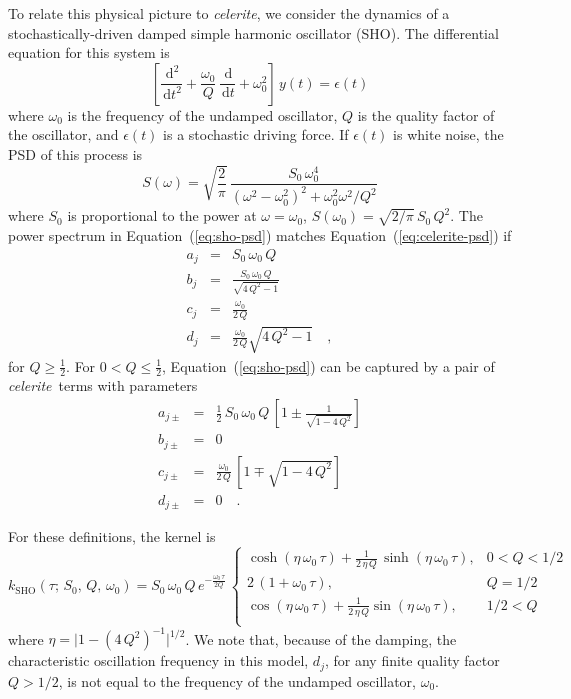 \documentclass[manuscript, letterpaper]{aastex6}
\newcommand{\celeriteterm}{\emph{celerite}}
\renewcommand{\eqref}[1]{\ref{eq:#1}}
\newcommand{\Eq}[1]{Equation~(\eqref{#1})}
\newcommand{\eq}[1]{\Eq{#1}}
\newcommand{\eqlabel}[1]{\label{eq:#1}}
\newcommand{\dd}{\ensuremath{\,\mathrm{d}}}
\begin{document}
To relate this physical picture to \celeriteterm, we consider the dynamics of a
stochastically-driven damped simple harmonic oscillator (SHO).
The differential equation for this system is
\begin{equation}
    \left[\frac{\dd^2}{\dd t^2} + \frac{\omega_0}{Q}\,\frac{\dd}{\dd t}
    + \omega_0^2\right]\, y(t) = \epsilon(t)
\end{equation}
where $\omega_0$ is the frequency of the undamped oscillator, $Q$ is the
quality factor of the oscillator, and $\epsilon(t)$ is a stochastic driving
force.
If $\epsilon(t)$ is white noise, the PSD of this process is
\citep{Anderson:1990}
\begin{equation}\eqlabel{sho-psd}
S(\omega) = \sqrt{\frac{2}{\pi}}\,\frac{S_0\,\omega_0^4}
    {(\omega^2-\omega_0^2)^2 + \omega_0^2\omega^2/Q^2}
\end{equation}
where $S_0$ is proportional to the power at $\omega = \omega_0$, $S(\omega_0)
= \sqrt{2/\pi}\,S_0\,Q^2$.
The power spectrum in \eq{sho-psd} matches \eq{celerite-psd} if
\begin{eqnarray}\eqlabel{sho-complex}
a_j &=& S_0\,\omega_0\,Q \\
b_j &=& \frac{S_0\,\omega_0\,Q}{\sqrt{4\,Q^2-1}} \\
c_j &=& \frac{\omega_0}{2\,Q}\\
d_j &=& \frac{\omega_0}{2\,Q} \sqrt{4\,Q^2-1} \quad,
\end{eqnarray}
for $Q \ge \frac{1}{2}$.
For $0 < Q \le \frac{1}{2}$, \eq{sho-psd} can be captured by a pair of
\celeriteterm\
terms with parameters
\begin{eqnarray}\eqlabel{sho-real}
a_{j\pm} &=& \frac{1}{2}\,S_0\,\omega_0\,Q\,\left[ 1 \pm
        \frac{1}{\sqrt{1-4\,Q^2}}\right] \\
b_{j\pm} &=& 0 \nonumber\\
    c_{j\pm} &=& \frac{\omega_0}{2\,Q}\,\left[1 \mp \sqrt{1-4\,Q^2}\right]
    \nonumber\\
d_{j\pm} &=& 0 \quad. \nonumber
\end{eqnarray}

For these definitions, the kernel is
\begin{equation}\eqlabel{sho-kernel}
k_\mathrm{SHO}(\tau;\,S_0,\,Q,\,\omega_0) =
S_0\,\omega_0\,Q\,e^{-\frac{\omega_0\,\tau}{2Q}}\,
\begin{cases}
    \cosh{(\eta\,\omega_0\,\tau)} +
        \frac{1}{2\,\eta\,Q}\,\sinh{(\eta\,\omega_0\,\tau)}, & 0 < Q < 1/2\\
    2\,(1+\omega_0\,\tau), & Q = 1/2\\
    \cos{(\eta\,\omega_0\,\tau)} +
        \frac{1}{2\,\eta\,Q} \sin{(\eta\,\omega_0\,\tau)},& 1/2 < Q\\
\end{cases}
\end{equation}
where $\eta = \vert 1-(4\,Q^2)^{-1}\vert^{1/2}$.
We note that, because of the damping, the characteristic oscillation frequency
in this model, $d_j$, for any finite quality factor $Q > 1/2$, is not equal to
the frequency of the undamped oscillator, $\omega_0$.
\end{document}
